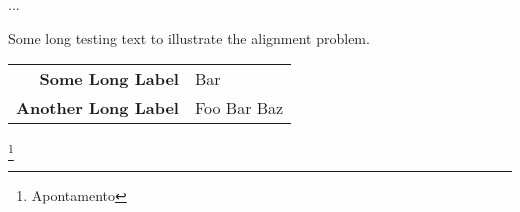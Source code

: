 \begin{multicols}{3}
...
\end{multicols}



\begin{minipage}[t]{.49\textwidth}
\flushleft
Some long testing text to illustrate the alignment problem.
\end{minipage}
%
\hfill
%
\noindent
\begin{minipage}[t]{.49\textwidth}
\flushright
\begin{tabular}{r l}
\textbf{Some Long Label} & Bar \\
\textbf{Another Long Label} & Foo Bar Baz \\
\end{tabular}
\end{minipage}













\newpage
\listoffigures
\cite{*}

\newpage
\footnote{Apontamento}

